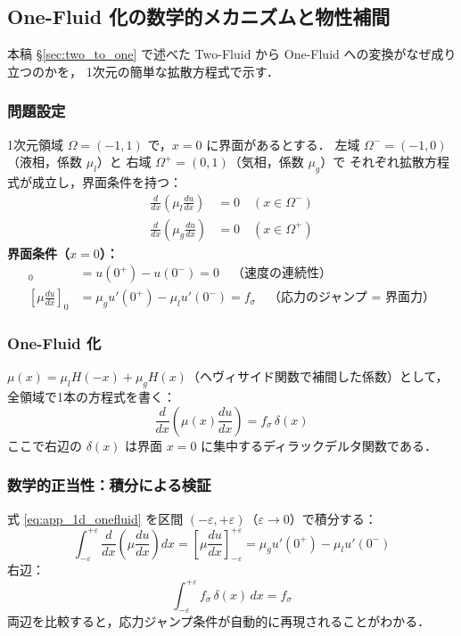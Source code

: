 \subsection{One-Fluid 化の数学的メカニズムと物性補間}
\label{app:onefluid_1d}

本稿 §\ref{sec:two_to_one} で述べた Two-Fluid から One-Fluid への変換がなぜ成り立つのかを，
1次元の簡単な拡散方程式で示す．

\subsubsection*{問題設定}

1次元領域 $\Omega = (-1, 1)$ で，$x=0$ に界面があるとする．
左域 $\Omega^- = (-1,0)$（液相，係数 $\mu_l$）と
右域 $\Omega^+ = (0,1)$（気相，係数 $\mu_g$）で
それぞれ拡散方程式が成立し，界面条件を持つ：
\begin{align}
  \frac{d}{dx}\!\left(\mu_l \frac{du}{dx}\right) &= 0 \quad (x \in \Omega^-) \\
  \frac{d}{dx}\!\left(\mu_g \frac{du}{dx}\right) &= 0 \quad (x \in \Omega^+)
\end{align}
\textbf{界面条件（$x=0$）：}
\begin{align}
  [u]_0 &= u(0^+) - u(0^-) = 0 \quad\text{（速度の連続性）} \\
  \left[\mu\frac{du}{dx}\right]_0
  &= \mu_g u'(0^+) - \mu_l u'(0^-)
   = f_\sigma \quad\text{（応力のジャンプ = 界面力）}
\end{align}

\subsubsection*{One-Fluid 化}

$\mu(x) = \mu_l H(-x) + \mu_g H(x)$（ヘヴィサイド関数で補間した係数）として，
全領域で1本の方程式を書く：
\begin{equation}
  \frac{d}{dx}\!\left(\mu(x) \frac{du}{dx}\right) = f_\sigma\,\delta(x)
  \label{eq:app_1d_onefluid}
\end{equation}
ここで右辺の $\delta(x)$ は界面 $x=0$ に集中するディラックデルタ関数である．

\subsubsection*{数学的正当性：積分による検証}

式 \eqref{eq:app_1d_onefluid} を区間 $(-\varepsilon, +\varepsilon)$（$\varepsilon \to 0$）で積分する：
\[
  \int_{-\varepsilon}^{+\varepsilon} \frac{d}{dx}\!\left(\mu\frac{du}{dx}\right) dx
  = \left[\mu\frac{du}{dx}\right]_{-\varepsilon}^{+\varepsilon}
  = \mu_g u'(0^+) - \mu_l u'(0^-)
\]
右辺：
\[
  \int_{-\varepsilon}^{+\varepsilon} f_\sigma\,\delta(x)\,dx = f_\sigma
\]
両辺を比較すると，応力ジャンプ条件が自動的に再現されることがわかる．

